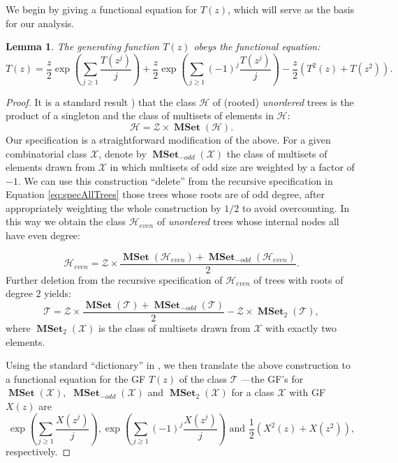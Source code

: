 \documentclass{amsart}
\theoremstyle{plain}
\newtheorem{lemma}{Lemma}
\newcommand{\nicetrees}{T}
\newcommand{\nicetreesc}{\mathcal{T}}
\DeclareMathOperator{\MSet}{\textbf{MSet}}
\newcommand{\MSetOdd}{\MSet_{-odd}}
\newcommand{\MSetTwo}{\MSet_{2}}
\begin{document}
 




We begin by giving a functional equation for $T(z)$, which will serve as the basis for our analysis.

\begin{lemma}\label{lemma:spec1}
The generating function $\nicetrees(z)$ obeys the functional equation:
\begin{equation}\label{eq:spec}
 T(z) = \frac{z}{2} \exp\left(\sum\limits_{j \geq 1} \frac{\nicetrees(z^j)}{j}\right) + \frac{z}{2}\exp\left(\sum\limits_{j \geq 1} (-1)^j \frac{\nicetrees(z^j)}{j} \right)  
-\frac{z}{2}\left({T^2(z)} + {\nicetrees(z^2)} \right).
\end{equation}
\end{lemma}
\begin{proof}
It is a standard result  \cite[Figure I.13, p. 65]{Flajolet:2009:AC:1506267})
that the class $\mathcal{H}$ of (rooted)  {\em unordered} trees is 
the product of a singleton and the class of multisets of elements in $\mathcal{H}$:
\begin{equation}\label{eq:specAllTrees}
    \mathcal{H} = \mathcal{Z} \times \MSet(\mathcal{H}).
\end{equation}
%
Our specification is a straightforward modification of the above.
For a given combinatorial class $\mathcal{X}$, denote 
by $\MSetOdd(\mathcal{X})$ the class of multisets of elements drawn from $\mathcal{X}$
in which multisets of odd size are weighted by a factor of $-1$.
We can use this construction ``delete'' from the recursive 
specification in Equation \eqref{eq:specAllTrees} those
trees whose roots are of odd degree, after 
appropriately weighting the whole construction by $1/2$ to avoid overcounting. 
In this way we obtain the class $\mathcal{H}_{even}$ of {\em  unordered}
trees whose internal nodes all have even degree:

\begin{equation*} 
\mathcal{H}_{even} = \mathcal{Z} \times \frac{\MSet(\mathcal{H}_{even}) + 
\MSetOdd(\mathcal{H}_{even})}{2}.
\end{equation*}
%
Further deletion from the recursive specification of $\mathcal{H}_{even}$ of
trees with roots of  degree $2$ yields:
%
\begin{equation*}
\nicetreesc = \mathcal{Z} \times \frac{\MSet(\nicetreesc) + 
\MSetOdd(\nicetreesc)}{2} - 
\mathcal{Z}\times\MSetTwo\left(\nicetreesc\right), 
\end{equation*}
%
where $\MSet_2(\mathcal{X})$ is the class of multisets drawn from $\mathcal{X}$ with exactly two elements.

Using the standard ``dictionary'' in \cite[Figure I.18, p. 93]{Flajolet:2009:AC:1506267}, we then translate the above construction to a functional equation for
the GF  $\nicetrees(z)$ of the class $\nicetreesc$ ---the GF's  for $\MSet(\mathcal{X}),$ $\MSetOdd(\mathcal{X})$ and $\MSet_2(\mathcal{X})$ for a class $\mathcal{X}$ with GF $X(z)$ are $$
\exp\left(\sum\limits_{j \geq 1} \frac{X(z^j)}{j}\right), \exp\left(\sum\limits_{j \geq 1} (-1)^j \frac{X(z^j)}{j}\right) \mbox{ and } \frac{1}{2}\left(X^2(z) + X(z^2) \right),$$ respectively. 
\end{proof}
\end{document}
